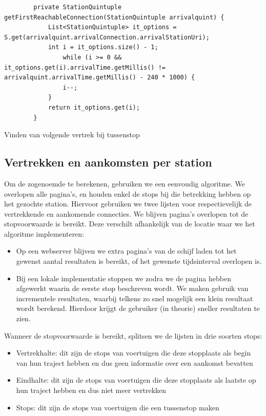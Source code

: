 \begin{code}[h]
	\begin{verbatim}
		private StationQuintuple getFirstReachableConnection(StationQuintuple arrivalquint) {
			List<StationQuintuple> it_options = S.get(arrivalquint.arrivalConnection.arrivalStationUri);
			int i = it_options.size() - 1;
				while (i >= 0 && it_options.get(i).arrivalTime.getMillis() != arrivalquint.arrivalTime.getMillis() - 240 * 1000) {
				i--;
			}
			return it_options.get(i);
		}
	\end{verbatim}
	\caption[CSA: Journey extraction bij tussenstops]{Vinden van volgende vertrek bij tussenstop}
	\label{code:2:csaJourneyExtractionReachable}
\end{code}

\subsection{Vertrekken en aankomsten per station}
Om de zogenoemde  te berekenen, gebruiken we een eenvoudig algoritme. We overlopen alle pagina's, en houden enkel de stops bij die betrekking hebben op het gezochte station. Hiervoor gebruiken we twee lijsten voor respectievelijk de vertrekkende en aankomende connecties. We blijven pagina's overlopen tot de stopvoorwaarde is bereikt. Deze verschilt afhankelijk van de locatie waar we het algoritme implementeren:
\begin{itemize}
	\item Op een webserver blijven we extra pagina's van de schijf laden tot het gewenst aantal resultaten is bereikt, of het gewenste tijdsinterval overlopen is.
	\item Bij een lokale implementatie stoppen we zodra we de pagina hebben afgewerkt waarin de eerste stop beschreven wordt. We maken gebruik van incrementele resultaten, waarbij telkens zo snel mogelijk een klein resultaat wordt berekend. Hierdoor krijgt de gebruiker (in theorie) sneller resultaten te zien.
\end{itemize}

Wanneer de stopvoorwaarde is bereikt, splitsen we de lijsten in drie soorten stops:
\begin{itemize}
	\item Vertrekhalte:  dit zijn de stops van voertuigen die deze stopplaats als begin van hun traject hebben en dus geen informatie over een aankomst bevatten
	\item Eindhalte: dit zijn de stops van voertuigen die deze stopplaats als laatste op hun traject hebben en dus niet meer vertrekken
	\item Stops: dit zijn de stops van voertuigen die een tussenstop maken
\end{itemize}

